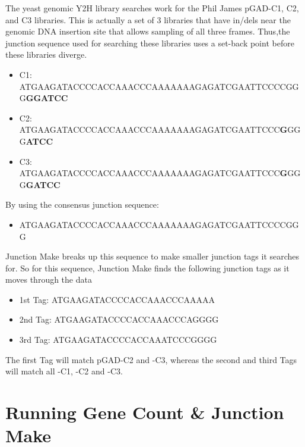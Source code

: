 \documentclass[11pt,fleqn]{book} %
\newcommand{\GeneCount}{{\color{Red} Gene Count }}
\newcommand{\JunctionMake}{{\color{Blue} Junction Make }}
\begin{document}
\begin{remark}
The yeast genomic Y2H library searches work for the Phil James pGAD-C1, C2, and C3 libraries.  This is actually a set of 3 libraries that have in/dels near the genomic DNA insertion site that allows sampling of all three frames.  Thus,the junction sequence used for searching these libraries uses a set-back point before these libraries diverge.
\begin{itemize}
  \item C1:  {\ttfamily ATGAAGATACCCCACCAAACCCAAAAAAAGAGATCGAATTCCCCGGG{\bfseries GGATCC}}
  \item C2:  {\ttfamily ATGAAGATACCCCACCAAACCCAAAAAAAGAGATCGAATTCCC{\bfseries G}GGG{\bfseries ATCC}}   
  \item C3:  {\ttfamily ATGAAGATACCCCACCAAACCCAAAAAAAGAGATCGAATTCCC{\bfseries G}GGG{\bfseries GATCC}}   
\end{itemize}
By using the consensus junction  sequence:
\begin{itemize}
  \item ATGAAGATACCCCACCAAACCCAAAAAAAGAGATCGAATTCCCCGGG
\end{itemize}
\JunctionMake breaks up this sequence to make smaller junction tags it searches for. So for this sequence, \JunctionMake finds the following junction tags as it moves through the data
\begin{itemize}
  \item 1st Tag:  {\ttfamily ATGAAGATACCCCACCAAACCCAAAAA{\color{RoyalBlue}{\bfseries AAGAGATCGAATTCCCGGGG}}}  
  \item 2nd Tag:  {\ttfamily ATGAAGATACCCCACCAAACCCA{\color{RoyalBlue}{\bfseries AAAAAAGAGATCGAATTCCC}}GGGG}   
  \item 3rd Tag:  {\ttfamily ATGAAGATACCCCACCAAA{\color{RoyalBlue}{\bfseries CCCAAAAAAAGAGATCGAAT}}TCCCGGGG}   
\end{itemize}
The first Tag will match pGAD-C2 and -C3, whereas the second and third Tags will match all -C1, -C2 and -C3.
\end{remark}



\chapter{Running \GeneCount \& \JunctionMake}
\end{document}
